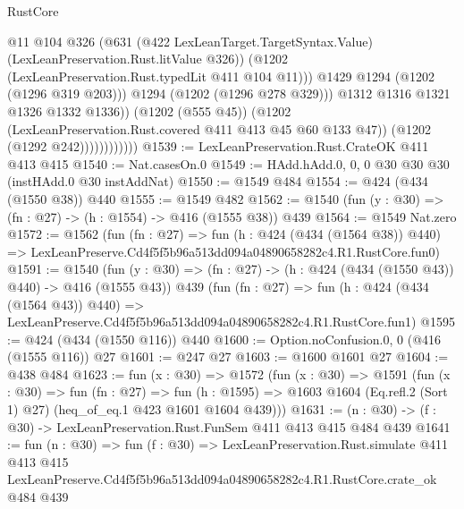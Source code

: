 \begin{lexlean}{RustCore}
\begin{coremodule}
                                  @11
                                  @104
                                  @326
                                  (@631
                                    (@422 LexLeanTarget.TargetSyntax.Value)
                                    (LexLeanPreservation.Rust.litValue @326))
                                  (@1202 (LexLeanPreservation.Rust.typedLit @411 @104 @11)))
                                @1429
                                @1294
                                (@1202 (@1296 @319 @203)))
                              @1294
                              (@1202 (@1296 @278 @329)))
                            @1312
                            @1316
                            @1321
                            @1326
                            @1332
                            @1336))
                        (@1202 (@555 @45))
                        (@1202 (LexLeanPreservation.Rust.covered @411 @413 @45 @60 @133 @47))
                        (@1202 (@1292 @242))))))))))))
@1539 := LexLeanPreservation.Rust.CrateOK @411 @413 @415
@1540 := Nat.casesOn.{0}
@1549 := HAdd.hAdd.{0, 0, 0} @30 @30 @30 (instHAdd.{0} @30 instAddNat)
@1550 := @1549 @484
@1554 := @424 (@434 (@1550 @38)) @440
@1555 := @1549 @482
@1562 := @1540 (fun (y : @30) => (fn : @27) -> (h : @1554) -> @416 (@1555 @38)) @439
@1564 := @1549 Nat.zero
@1572 := @1562
    (fun (fn : @27) =>
    fun (h : @424 (@434 (@1564 @38)) @440) =>
    LexLeanPreserve.Cd4f5f5b96a513dd094a04890658282c4.R1.RustCore.fun0)
@1591 := @1540
    (fun (y : @30) => (fn : @27) -> (h : @424 (@434 (@1550 @43)) @440) -> @416 (@1555 @43))
    @439
    (fun (fn : @27) =>
    fun (h : @424 (@434 (@1564 @43)) @440) =>
    LexLeanPreserve.Cd4f5f5b96a513dd094a04890658282c4.R1.RustCore.fun1)
@1595 := @424 (@434 (@1550 @116)) @440
@1600 := Option.noConfusion.{0, 0} (@416 (@1555 @116)) @27
@1601 := @247 @27
@1603 := @1600 @1601 @27
@1604 := @438 @484
@1623 := fun (x : @30) =>
  @1572
    (fun (x : @30) =>
    @1591
      (fun (x : @30) =>
      fun (fn : @27) =>
      fun (h : @1595) =>
      @1603 @1604 (Eq.refl.{2} (Sort 1) @27) (heq_of_eq.{1} @423 @1601 @1604 @439)))
@1631 := (n : @30) -> (f : @30) -> LexLeanPreservation.Rust.FunSem @411 @413 @415 @484 @439
@1641 := fun (n : @30) =>
  fun (f : @30) =>
  LexLeanPreservation.Rust.simulate
    @411
    @413
    @415
    LexLeanPreserve.Cd4f5f5b96a513dd094a04890658282c4.R1.RustCore.crate_ok
    @484
    @439
\end{coremodule}
\end{lexlean}
